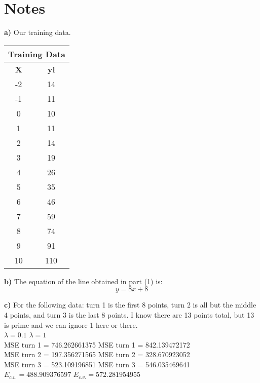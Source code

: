 \documentclass{article}
\begin{document}
\section*{Notes}

\hspace{1em} \textbf{a)} Our training data.

\begin{center}
\begin{tabular}{|c|c|}
	\hline
	\multicolumn{2}{|c|}{\textbf{Training Data}} \\\hline
	\textbf{X} & \textbf{yl} \\\hline
	-2 & 14 \\
	-1 & 11\\
	0 & 10\\
	1 & 11 \\
	2 & 14\\
	3 & 19 \\
	4 & 26\\
	5 & 35\\
	6 & 46\\
	7 & 59\\
	8 & 74\\
	9 & 91\\
	10 & 110\\
	\hline
\end{tabular}
\end{center}

\textbf{b)} The equation of the line obtained in part (1) is: $$y = 8 x  + 8$$ 

\textbf{c)} For the following data: turn 1 is the first 8 points, turn 2 is all but the middle 4 points, and turn 3 is the last 8 points. 
I know there are 13 points total, but 13 is prime and we can ignore 1 here or there. \\

 $\lambda = 0.1$  \hspace{20em} $\lambda = 1$ \\
 MSE turn  1  =  746.262661375  \hspace{10em} MSE turn  1  =  842.139472172 \\
MSE turn  2  =  197.356271565  \hspace{10em} MSE turn  2  =  328.670923052 \\
MSE turn  3  =  523.109196851  \hspace{10em} MSE turn  3  = 546.035469641  \\
$E_{c.v.} =  488.909376597$  \hspace{13em} $E_{c.v.} =  572.281954955$ \\
\end{document}
